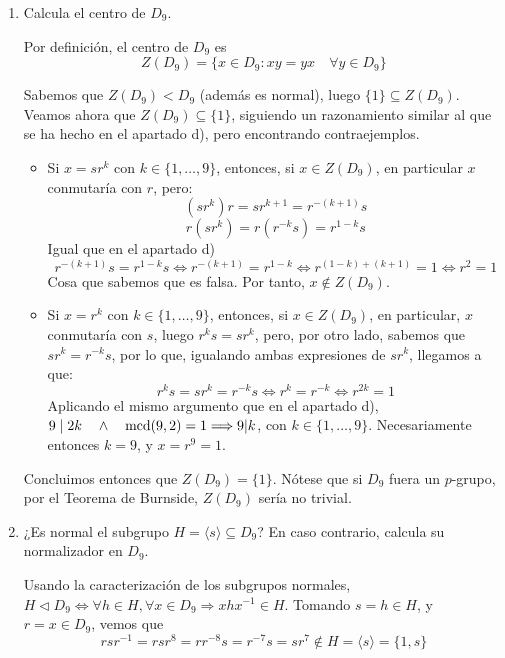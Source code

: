 \documentclass[12pt]{article}
\begin{document}
\begin{ejercicio}
\begin{enumerate}[label=(\alph*)]
            \newpage

            \item Calcula el centro de $D_9$.
            
            Por definición, el centro de $D_9$ es $$Z(D_9) = \{x \in D_9 : xy = yx \quad \forall y \in D_9\}$$ 

            Sabemos que $Z(D_9) < D_9$ (además es normal), luego $\{1\} \subseteq Z(D_9)$. Veamos ahora que $Z(D_9) \subseteq \{1\}$, siguiendo un razonamiento similar al que se ha hecho en el apartado d), pero encontrando contraejemplos.

            \begin{itemize}
                \item Si $x = sr^k$ con $k \in \{1, \ldots, 9\}$, entonces, si $x \in Z(D_9)$, en particular $x$ conmutaría con $r$, pero:
                $$(sr^k)r = sr^{k+1} = r^{-(k+1)}s$$
                $$r(sr^k) = r(r^{-k}s) = r^{1-k}s$$
                Igual que en el apartado d) $$r^{-(k+1)}s = r^{1-k}s \iff r^{-(k+1)} = r^{1-k} \iff r^{(1-k)+(k+1)} = 1 \iff r^{2} = 1$$
                Cosa que sabemos que es falsa. Por tanto, $x \notin Z(D_9)$.
                \item Si $x = r^k$ con $k \in \{1, \ldots, 9\}$, entonces, si $x \in Z(D_9)$, en particular, $x$ conmutaría con $s$, luego $r^k s = s r^k$, pero, por otro lado, sabemos que $sr^k = r^{-k}s$, por lo que, igualando ambas expresiones de $sr^k$, llegamos a que:
                $$r^{k}s = sr^k = r^{-k}s \iff r^k = r^{-k} \iff r^{2k} = 1$$
                Aplicando el mismo argumento que en el apartado d), $9 \mid 2k \quad \land \quad \operatorname{mcd}(9,2) = 1 \Longrightarrow 9|k$, con $k \in \{1, \ldots, 9\}$. Necesariamente entonces $k=9$, y $x = r^{9} = 1$. 
            \end{itemize}

            Concluimos entonces que $Z(D_9) = \{1\}$. Nótese que si $D_9$ fuera un $p$-grupo, por el Teorema de Burnside, $Z(D_9)$ sería no trivial.

            \item ¿Es normal el subgrupo $H = \langle s \rangle \subseteq D_9$? En caso contrario, calcula su normalizador en $D_9$.
            
            Usando la caracterización de los subgrupos normales, $H \vartriangleleft D_9 \iff \forall h \in H, \forall x \in D_9 \Longrightarrow xhx^{-1} \in H$. Tomando $s = h \in H$, y $r = x \in D_9$, vemos que
            $$rsr^{-1} = rsr^{8} = rr^{-8}s = r^{-7}s = sr^{7} \notin H = \langle s \rangle = \{1,s\}$$


\end{enumerate}
\end{ejercicio}
\end{document}
